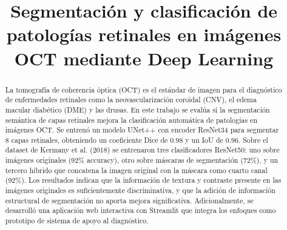 \documentclass[journal, twocolumn]{IEEEtran}
\begin{document}

\title{Segmentación y clasificación de patologías retinales en imágenes OCT mediante Deep Learning}

\author{

\and
{}

\and
{}

\and
{}

\and
{}

}

\maketitle


\begin{abstract}
La tomografía de coherencia óptica (OCT) es el estándar de imagen para el diagnóstico de enfermedades retinales como la neovascularización coroidal (CNV), el edema macular diabético (DME) y las drusas. En este trabajo se evalúa si la segmentación semántica de capas retinales mejora la clasificación automática de patologías en imágenes OCT. Se entrenó un modelo UNet++ con encoder ResNet34 para segmentar 8 capas retinales, obteniendo un coeficiente Dice de 0.98 y un IoU de 0.96. Sobre el dataset de Kermany et al. (2018) se entrenaron tres clasificadores ResNet50: uno sobre imágenes originales (92\% accuracy), otro sobre máscaras de segmentación (72\%), y un tercero híbrido que concatena la imagen original con la máscara como cuarto canal (92\%). Los resultados indican que la información de textura y contraste presente en las imágenes originales es suficientemente discriminativa, y que la adición de información estructural de segmentación no aporta mejora significativa. Adicionalmente, se desarrolló una aplicación web interactiva con Streamlit que integra los enfoques como prototipo de sistema de apoyo al diagnóstico.
\end{abstract}
\end{document}
